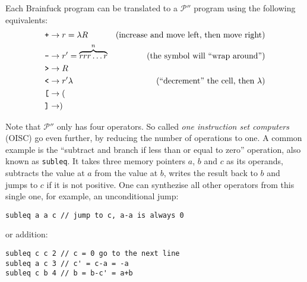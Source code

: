 Each Brainfuck program can be translated  to a $\mathcal{P}''$ program using the following equivalents:
\begin{align*}
    \text{\texttt{+}} &\rightarrow r = \lambda R &\text{(increase and move left, then move right)}\\
    \text{\texttt{-}} &\rightarrow r' = \overbrace{rrr\dots r}^n &\text{(the symbol will “wrap around”)}\\
    \text{\texttt{>}} &\rightarrow R\\
    \text{\texttt{<}} &\rightarrow r'\lambda &\text{(“decrement” the cell, then $\lambda$)}\\
    \text{\texttt{[}} &\rightarrow (\\
    \text{\texttt{]}} &\rightarrow )
\end{align*}

Note that $\mathcal{P}''$ only has four operators. So called \emph{one instruction set computers} (OISC) go even further, by reducing the number of operations to one. A common example is the “subtract and branch if less than or equal to zero” operation, also known as \texttt{subleq}. It takes three memory pointers $a$, $b$ and $c$ as its operands, subtracts the value at $a$ from the value at $b$, writes the result back to $b$ and jumps to $c$ if it is not positive. One can synthezise all other operators from this single one, for example, an unconditional jump:

\begin{lstlisting}
subleq a a c // jump to c, a-a is always 0
\end{lstlisting}

or addition:

\begin{lstlisting}
subleq c c 2 // c = 0 go to the next line
subleq a c 3 // c' = c-a = -a
subleq c b 4 // b = b-c' = a+b
\end{lstlisting}
